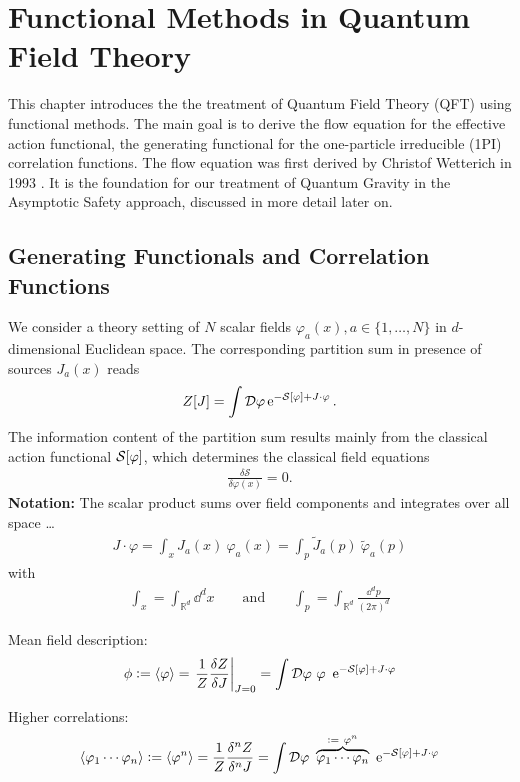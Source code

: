 \chapter{Functional Methods in Quantum Field Theory}
This chapter introduces the the treatment of Quantum Field Theory (QFT) using functional methods. The main goal is to derive the flow equation for the effective action functional, the generating functional for the one-particle irreducible (1PI) correlation functions. The flow equation was first derived by Christof Wetterich in 1993 \cite{Wetterich1992}. It is the foundation for our treatment of Quantum Gravity in the Asymptotic Safety approach, discussed in more detail later on.
\section{Generating Functionals and Correlation Functions}
We consider a theory setting of $N$ scalar fields $\varphi_a(x), a \in \{1,\dots,N\}$ in $d$-dimensional Euclidean space. The corresponding partition sum in presence of sources $J_a(x)$ reads
\begin{align}
	Z[J] =  \int \D\varphi \operatorname{e}^{-\S + J\cdot\varphi}.
\end{align}
The information content of the partition sum results mainly from the classical action functional $\S$, which determines the classical field equations
\begin{align}
	\frac{\delta \mathcal{S}}{\delta\varphi(x)} = 0.
\end{align}
\textbf{Notation:} The scalar product sums over field components and integrates over all space \dots
\begin{align}
	J\cdot\varphi = \int_x J_a(x) \ \varphi_a(x) = \int_p \tilde{J}_a(p) \ \tilde{\varphi}_a(p)
\end{align}
with
\begin{align}
\int_x = \int_{\mathbb{R}^d} \dd^d x \qquad \text{and} \qquad \int_p = \int_{\mathbb{R}^d} \frac{\dd^d p}{(2\pi)^d}	
\end{align}

Mean field description:
\begin{align}
	\phi := \cf{\varphi} = \eval{\frac{1}{Z}\frac{\delta Z}{\delta J}}_{J=0} = \int \D\varphi \ \varphi \ \operatorname{e}^{-\S + J\cdot\varphi}  
\end{align}

Higher correlations:
\begin{align}
\cf{\varphi_1 \cdots \varphi_n} := \cf{\varphi^n} = \frac{1}{Z}\frac{\delta^n Z}{\delta^n J} = \int \D\varphi \ \overbrace{\varphi_1 \cdots \varphi_n}^{:= \ \varphi^n} \ \operatorname{e}^{-\S + J\cdot\varphi}  
\end{align}

